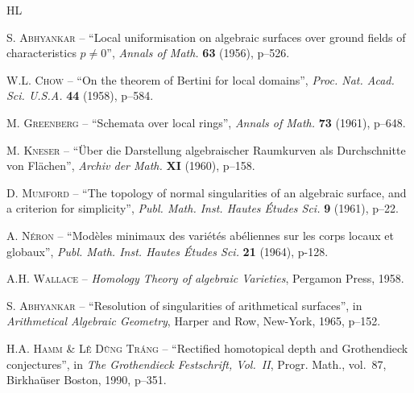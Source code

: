 \begin{thebibliography}{HL}\label{XIII.7}

\textsc{S. Abhyankar} -- ``Local uniformisation on algebraic surfaces over ground fields of characteristics $p\neq0$'', \emph{Annals of Math.} \textbf{63} (1956), p--526.


\textsc{W.L. Chow} -- ``On the theorem of Bertini for local domains'', \emph{Proc. Nat. Acad. Sci. U.S.A.} \textbf{44} (1958), p--584.


\textsc{M. Greenberg} -- ``Schemata over local rings'', \emph{Annals of Math.} \textbf{73} (1961), p--648.


\textsc{M. Kneser} -- ``\"Uber die Darstellung algebraischer Raumkurven als Durchschnitte von Fl\"achen'', \emph{Archiv der Math.} \textbf{XI} (1960), p--158.


\textsc{D. Mumford} -- ``The topology of normal singularities of an algebraic surface, and a criterion for simplicity'', \emph{Publ. Math. Inst. Hautes \'Etudes Sci.} \textbf{9} (1961), p--22.


\textsc{A. N\'eron} -- ``Mod\`eles minimaux des vari\'et\'es ab\'eliennes sur les corps locaux et globaux'', \emph{Publ. Math. Inst. Hautes \'Etudes Sci.} \textbf{21} (1964), p-128.


\textsc{A.H. Wallace} -- \emph{Homology Theory of algebraic Varieties}, Pergamon Press, 1958.


\textsc{S. Abhyankar} -- ``Resolution of singularities of arithmetical surfaces'', in \emph{Arithmetical Algebraic Geometry}, Harper and Row, New-York, 1965, p--152.


%
\textsc{H.A. Hamm \& L\^e D\~ung Tr\'ang} -- ``Rectified homotopical depth and Grothendieck conjectures'', in \emph{The Grothendieck Festschrift, Vol.~II}, Progr. Math., vol.~87, Birkhaüser Boston, 1990, p--351.

\end{thebibliography}
